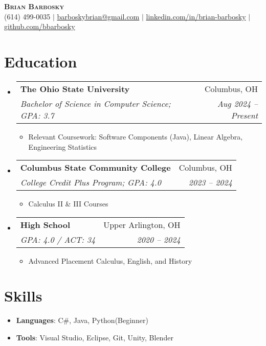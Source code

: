 \documentclass[letterpaper,11pt]{article}
\makeatletter
\newcommand{\resumeItem}[1]{ 
  \item\small{\parbox[t]{0.8\textwidth}{#1} \vspace{-2pt}} 
  }
\newcommand{\resumeSubheading}[4]{ 
  \vspace{-2pt}\item 
  \begin{tabular*}{0.97\textwidth}[t]{l@{\extracolsep{\fill}}r} 
    \textbf{#1} & #2 \\ 
    \textit{\small#3} & \textit{\small #4} \\ 
  \end{tabular*}\vspace{-7pt} 
}
\newcommand{\resumeSubHeadingListStart}{\begin{itemize}[leftmargin=0.15in, label={}]}
\newcommand{\resumeSubHeadingListEnd}{\end{itemize}}
\newcommand{\resumeItemListStart}{\begin{itemize}[leftmargin=0.15in, label={}]}
\newcommand{\resumeItemListEnd}{\end{itemize}\vspace{-5pt}}
\makeatother
\begin{document}
 

\begin{center} 
    \textbf{\Huge \scshape Brian Barbosky} \\ \vspace{1pt} 
    \small (614) 499-0035 $|$ \href{mailto:barboskybrian@gmail.com}{barboskybrian@gmail.com} $|$ 
    \href{https://www.linkedin.com/in/brian-barbosky}{linkedin.com/in/brian-barbosky} $|$ 
    \href{https://github.com/bbarbosky}{github.com/bbarbosky} 
\end{center} 

\section{Education} 
  \resumeSubHeadingListStart 
    \resumeSubheading 
      {The Ohio State University}{Columbus, OH} 
      {Bachelor of Science in Computer Science; GPA: 3.7}{Aug 2024 -- Present} 
      \resumeItemListStart 
        \resumeItem{Relevant Coursework: Software Components (Java), Linear Algebra, Engineering Statistics} 
      \resumeItemListEnd 
    \resumeSubheading 
      {Columbus State Community College}{Columbus, OH} 
      {College Credit Plus Program; GPA: 4.0}{2023 -- 2024} 
      \resumeItemListStart 
        \resumeItem{Calculus II \& III Courses} 
      \resumeItemListEnd 
    \resumeSubheading 
      {High School}{Upper Arlington, OH} 
      {GPA: 4.0 / ACT: 34}{2020 -- 2024} 
      \resumeItemListStart 
        \resumeItem{Advanced Placement Calculus, English, and History} 
      \resumeItemListEnd 

  \resumeSubHeadingListEnd 

\section{Skills} 
  \resumeItemListStart 
    \resumeItem{\textbf{Languages}: C\#, Java,  Python(Beginner)} 
    \resumeItem{\textbf{Tools}: Visual Studio, Eclipse, Git, Unity, Blender} 
  \resumeItemListEnd 
\end{document}
